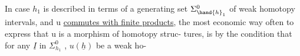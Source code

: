 In case $h_1$ is described in terms of a generating set $\Sigma^{0}_{\hand{h}_1}$  of weak
homotopy intervals,  and  u \uline{commutes with finite products},  the 
most economic way often to express that u is a morphism of homotopy struc-%
tures,  is by the condition that  for any $\underline{I}$ in $\Sigma^{0}_{h_1}$ ,  $u(\underline{h})$ be a weak ho-%

